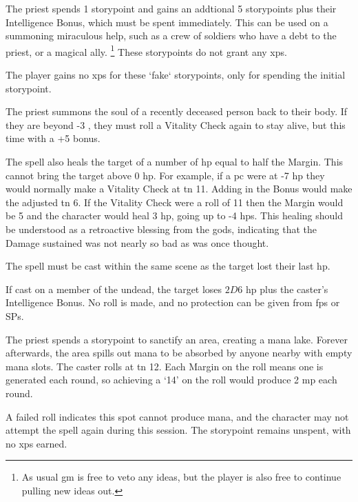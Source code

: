 \begin{multicols}{2}
\spelllevel


The priest spends 1 \gls{storypoint} and gains an addtional 5 \glspl{storypoint} plus their Intelligence Bonus, which must be spent immediately.
This can be used on a summoning miraculous help, such as a crew of soldiers who have a debt to the priest, or a magical ally.%
\footnote{As usual \gls{gm} is free to veto any ideas, but the player is also free to continue pulling new ideas out.}
These \glspl{storypoint} do not grant any \glspl{xp}.

The player gains no \glspl{xp} for these `fake` \glspl{storypoint}, only for spending the initial \gls{storypoint}.


The priest summons the soul of a recently deceased person back to their body.
If they are beyond -3 , they must roll a Vitality Check again to stay alive, but this time with a +5 bonus.

The spell also heals the target of a number of \gls{hp} equal to half the Margin.
This cannot bring the target above 0 \gls{hp}.
For example, if a \gls{pc} were at -7 \gls{hp} they would normally make a Vitality Check at \gls{tn} 11.
Adding in the Bonus would make the adjusted \gls{tn} 6.
If the Vitality Check were a roll of 11 then the Margin would be 5 and the character would heal 3 \gls{hp}, going up to -4 \glspl{hp}.
This healing should be understood as a retroactive blessing from the gods, indicating that the Damage sustained was not nearly so bad as was once thought.

The spell must be cast within the same scene as the target lost their last \gls{hp}.

If cast on a member of the undead, the target loses $2D6$ \gls{hp} plus the caster's Intelligence Bonus.
No roll is made, and no protection can be given from \glspl{fp} or \glspl{SP}.


The priest spends a \gls{storypoint} to sanctify an area, creating a mana lake.
Forever afterwards, the area spills out mana to be absorbed by anyone nearby with empty mana slots.
The caster rolls at \gls{tn} 12.
Each Margin on the roll means one  is generated each round, so achieving a `14' on the roll would produce 2 \gls{mp} each round.

A failed roll indicates this spot cannot produce mana, and the character may not attempt the spell again during this session.
The \gls{storypoint} remains unspent, with no \glspl{xp} earned.

\end{multicols}

